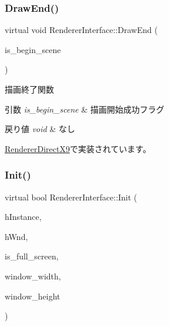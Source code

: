 \subsubsection{\texorpdfstring{Draw\+End()}{DrawEnd()}}
{\footnotesize\ttfamily virtual void Renderer\+Interface\+::\+Draw\+End (\begin{DoxyParamCaption}\item[{bool}]{is\+\_\+begin\+\_\+scene }\end{DoxyParamCaption})\hspace{0.3cm}{\ttfamily [pure virtual]}}



描画終了関数 


\begin{DoxyParams}{引数}
{\em is\+\_\+begin\+\_\+scene} & 描画開始成功フラグ \\
\hline
\end{DoxyParams}

\begin{DoxyRetVals}{戻り値}
{\em void} & なし \\
\hline
\end{DoxyRetVals}


\mbox{\hyperlink{class_renderer_direct_x9_a5f934597020f77dc9cf729acfb13a830}{Renderer\+Direct\+X9}}で実装されています。

\mbox{\label{class_renderer_interface_aabef76c27c2332c1af2dbcf7e8de5d38}} 
\subsubsection{\texorpdfstring{Init()}{Init()}}
{\footnotesize\ttfamily virtual bool Renderer\+Interface\+::\+Init (\begin{DoxyParamCaption}\item[{H\+I\+N\+S\+T\+A\+N\+CE}]{h\+Instance,  }\item[{H\+W\+ND}]{h\+Wnd,  }\item[{B\+O\+OL}]{is\+\_\+full\+\_\+screen,  }\item[{int}]{window\+\_\+width,  }\item[{int}]{window\+\_\+height }\end{DoxyParamCaption})\hspace{0.3cm}{\ttfamily [pure virtual]}}



